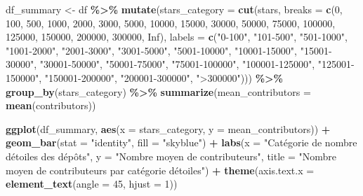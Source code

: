 \documentclass[
]{article}
\newenvironment{Shaded}{\begin{snugshade}}{\end{snugshade}}
\newcommand{\AttributeTok}[1]{\textcolor[rgb]{0.13,0.29,0.53}{#1}}
\newcommand{\ConstantTok}[1]{\textcolor[rgb]{0.56,0.35,0.01}{#1}}
\newcommand{\DecValTok}[1]{\textcolor[rgb]{0.00,0.00,0.81}{#1}}
\newcommand{\FunctionTok}[1]{\textcolor[rgb]{0.13,0.29,0.53}{\textbf{#1}}}
\newcommand{\NormalTok}[1]{#1}
\newcommand{\OtherTok}[1]{\textcolor[rgb]{0.56,0.35,0.01}{#1}}
\newcommand{\SpecialCharTok}[1]{\textcolor[rgb]{0.81,0.36,0.00}{\textbf{#1}}}
\newcommand{\StringTok}[1]{\textcolor[rgb]{0.31,0.60,0.02}{#1}}
\begin{document}
\begin{Shaded}
\begin{Highlighting}[]
\NormalTok{df\_summary }\OtherTok{\textless{}{-}}\NormalTok{ df }\SpecialCharTok{\%\textgreater{}\%}
  \FunctionTok{mutate}\NormalTok{(}\AttributeTok{stars\_category =} \FunctionTok{cut}\NormalTok{(stars, }\AttributeTok{breaks =} \FunctionTok{c}\NormalTok{(}\DecValTok{0}\NormalTok{, }\DecValTok{100}\NormalTok{, }\DecValTok{500}\NormalTok{, }\DecValTok{1000}\NormalTok{, }\DecValTok{2000}\NormalTok{, }\DecValTok{3000}\NormalTok{, }\DecValTok{5000}\NormalTok{, }\DecValTok{10000}\NormalTok{, }\DecValTok{15000}\NormalTok{, }\DecValTok{30000}\NormalTok{, }\DecValTok{50000}\NormalTok{, }\DecValTok{75000}\NormalTok{, }\DecValTok{100000}\NormalTok{, }\DecValTok{125000}\NormalTok{, }\DecValTok{150000}\NormalTok{, }\DecValTok{200000}\NormalTok{, }\DecValTok{300000}\NormalTok{, }\ConstantTok{Inf}\NormalTok{), }
                              \AttributeTok{labels =} \FunctionTok{c}\NormalTok{(}\StringTok{"0{-}100"}\NormalTok{, }\StringTok{"101{-}500"}\NormalTok{, }\StringTok{"501{-}1000"}\NormalTok{, }\StringTok{"1001{-}2000"}\NormalTok{, }\StringTok{"2001{-}3000"}\NormalTok{, }\StringTok{"3001{-}5000"}\NormalTok{, }\StringTok{"5001{-}10000"}\NormalTok{, }\StringTok{"10001{-}15000"}\NormalTok{, }\StringTok{"15001{-}30000"}\NormalTok{, }\StringTok{"30001{-}50000"}\NormalTok{, }\StringTok{"50001{-}75000"}\NormalTok{, }\StringTok{"75001{-}100000"}\NormalTok{, }\StringTok{"100001{-}125000"}\NormalTok{, }\StringTok{"125001{-}150000"}\NormalTok{, }\StringTok{"150001{-}200000"}\NormalTok{, }\StringTok{"200001{-}300000"}\NormalTok{, }\StringTok{"\textgreater{}300000"}\NormalTok{))) }\SpecialCharTok{\%\textgreater{}\%}
  \FunctionTok{group\_by}\NormalTok{(stars\_category) }\SpecialCharTok{\%\textgreater{}\%}
  \FunctionTok{summarize}\NormalTok{(}\AttributeTok{mean\_contributors =} \FunctionTok{mean}\NormalTok{(contributors))}

\FunctionTok{ggplot}\NormalTok{(df\_summary, }\FunctionTok{aes}\NormalTok{(}\AttributeTok{x =}\NormalTok{ stars\_category, }\AttributeTok{y =}\NormalTok{ mean\_contributors)) }\SpecialCharTok{+}
  \FunctionTok{geom\_bar}\NormalTok{(}\AttributeTok{stat =} \StringTok{"identity"}\NormalTok{, }\AttributeTok{fill =} \StringTok{"skyblue"}\NormalTok{) }\SpecialCharTok{+}
  \FunctionTok{labs}\NormalTok{(}\AttributeTok{x =} \StringTok{"Catégorie de nombre d\textquotesingle{}étoiles des dépôts"}\NormalTok{,}
       \AttributeTok{y =} \StringTok{"Nombre moyen de contributeurs"}\NormalTok{,}
       \AttributeTok{title =} \StringTok{"Nombre moyen de contributeurs par catégorie d\textquotesingle{}étoiles"}\NormalTok{) }\SpecialCharTok{+}
  \FunctionTok{theme}\NormalTok{(}\AttributeTok{axis.text.x =} \FunctionTok{element\_text}\NormalTok{(}\AttributeTok{angle =} \DecValTok{45}\NormalTok{, }\AttributeTok{hjust =} \DecValTok{1}\NormalTok{))}
\end{Highlighting}
\end{Shaded}
\end{document}
